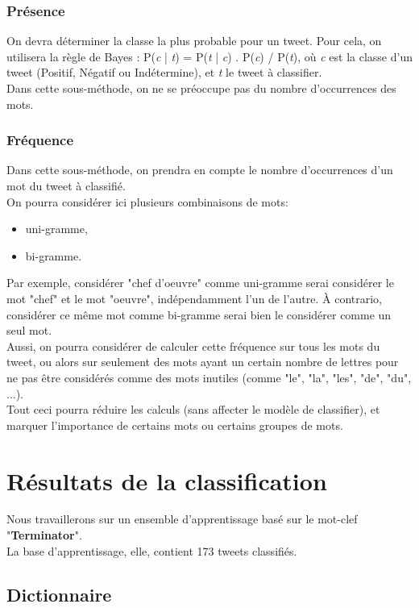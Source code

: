 \documentclass[pdftex,12pt,a4paper]{report}
\begin{document}
\begin{spacing}{1.2}
\subsection{Présence}

On devra déterminer la classe la plus probable pour un tweet. Pour cela, on utilisera la règle de Bayes : P(\textit{c} | \textit{t}) = P(\textit{t} | \textit{c}) . P(\textit{c}) / P(\textit{t}), où \textit{c} est la classe d'un tweet (Positif, Négatif ou Indétermine), et \textit{t} le tweet à classifier.
\\
Dans cette sous-méthode, on ne se préoccupe pas du nombre d'occurrences des mots.

\subsection{Fréquence}

Dans cette sous-méthode, on prendra en compte le nombre d'occurrences d'un mot du tweet à classifié.
\\
On pourra considérer ici plusieurs combinaisons de mots:
\begin{itemize}
\item{uni-gramme,}
\item{bi-gramme.}
\end{itemize}
Par exemple, considérer "chef d'oeuvre" comme uni-gramme serai considérer le mot "chef" et le mot "oeuvre", indépendamment l'un de l'autre. À contrario, considérer ce même mot comme bi-gramme serai bien le considérer comme un seul mot.
\\
Aussi, on pourra considérer de calculer cette fréquence sur tous les mots du tweet, ou alors sur seulement des mots ayant un certain nombre de lettres pour ne pas être considérés comme des mots inutiles (comme "le", "la", "les", "de", "du", ...).
\\
Tout ceci pourra réduire les calculs (sans affecter le modèle de classifier), et marquer l'importance de certains mots ou certains groupes de mots. 

\chapter{Résultats de la classification}

Nous travaillerons sur un ensemble d'apprentissage basé sur le mot-clef "\textbf{Terminator}".
\\
La base d'apprentissage, elle, contient 173 tweets classifiés.

\section{Dictionnaire}


\end{spacing}
\end{document}
